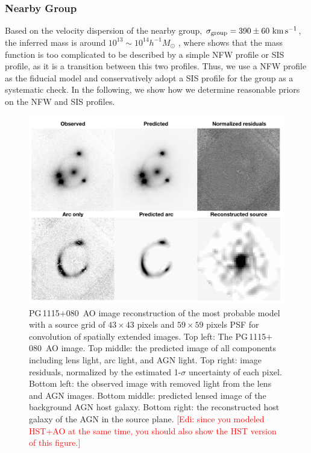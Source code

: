 \documentclass[useAMS,usenatbib]{mnras}
\newcommand\todo[1]{\textcolor{red}{#1}}
\newcommand\pg{PG\,1115$+$080}
\def\kms {\rm km\,s^{-1}}
\begin{document}
\subsubsection{Nearby Group}
\label{subsubsect:PG1115group}
Based on the velocity dispersion of the nearby group, $\sigma_{\textrm{group}}=390\pm60~\kms$, the inferred mass is around $10^{13}\sim10^{14}h^{-1}M_{\odot}$ \citep{WilsonEtal16}, where \citet{Oguri06} shows that the mass function is too complicated to be described by a simple NFW profile or SIS profile, as it is a transition between this two profiles. 
Thus, we use a NFW profile as the fiducial model and conservatively adopt a SIS profile for the group as a systematic check. 
In the following, we show how we determine reasonable priors on the NFW and SIS profiles.
\begin{figure}
\centering
\includegraphics[scale=0.7]{PG1115_AO_image_1.png}
\caption{\pg~AO image reconstruction of the most probable model with a source grid of $43 \times 43$ pixels and $59 \times 59$ pixels PSF for convolution of spatially extended images. Top left: The \pg~AO image. Top middle: the predicted image of all components including lens light, arc light, and AGN light. Top right: image residuals, normalized by the estimated 1-$\sigma$ uncertainty of each pixel. Bottom left: the observed image with removed light from the lens and  AGN images. Bottom middle: predicted lensed image of the background AGN host galaxy. Bottom right: the reconstructed host galaxy of the AGN in the source plane. \todo{[Edi: since you modeled HST+AO at the same time, you should also show the HST version of this figure.]}}
\label{fig:PG1115_figure}
\end{figure}
\end{document}
